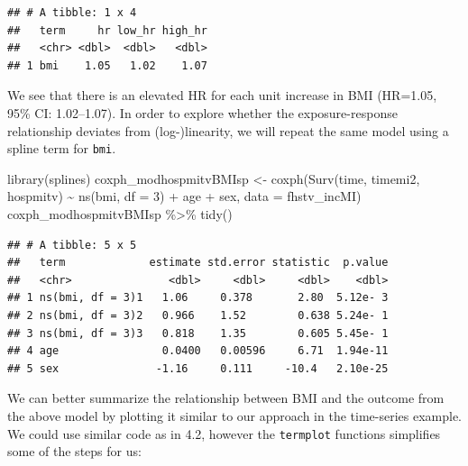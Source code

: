 \documentclass[
]{book}
\newenvironment{Shaded}{\begin{snugshade}}{\end{snugshade}}
\newcommand{\AttributeTok}[1]{\textcolor[rgb]{0.77,0.63,0.00}{#1}}
\newcommand{\DecValTok}[1]{\textcolor[rgb]{0.00,0.00,0.81}{#1}}
\newcommand{\FunctionTok}[1]{\textcolor[rgb]{0.00,0.00,0.00}{#1}}
\newcommand{\NormalTok}[1]{#1}
\newcommand{\OtherTok}[1]{\textcolor[rgb]{0.56,0.35,0.01}{#1}}
\newcommand{\SpecialCharTok}[1]{\textcolor[rgb]{0.00,0.00,0.00}{#1}}
\begin{document}
\begin{verbatim}
## # A tibble: 1 x 4
##   term     hr low_hr high_hr
##   <chr> <dbl>  <dbl>   <dbl>
## 1 bmi    1.05   1.02    1.07
\end{verbatim}

We see that there is an elevated HR for each unit increase in BMI (HR=1.05, 95\% CI: 1.02--1.07). In order to explore whether the exposure-response relationship deviates from (log-)linearity, we will repeat the same model using a spline term for \texttt{bmi}.

\begin{Shaded}
\begin{Highlighting}[]
\FunctionTok{library}\NormalTok{(splines)}
\NormalTok{coxph\_modhospmitvBMIsp }\OtherTok{\textless{}{-}} \FunctionTok{coxph}\NormalTok{(}\FunctionTok{Surv}\NormalTok{(time, timemi2, hospmitv) }\SpecialCharTok{\textasciitilde{}} 
                                  \FunctionTok{ns}\NormalTok{(bmi, }\AttributeTok{df =} \DecValTok{3}\NormalTok{) }\SpecialCharTok{+}\NormalTok{ age }\SpecialCharTok{+}\NormalTok{ sex, }
                                \AttributeTok{data =}\NormalTok{ fhstv\_incMI)}
\NormalTok{coxph\_modhospmitvBMIsp }\SpecialCharTok{\%\textgreater{}\%}
  \FunctionTok{tidy}\NormalTok{()}
\end{Highlighting}
\end{Shaded}

\begin{verbatim}
## # A tibble: 5 x 5
##   term             estimate std.error statistic  p.value
##   <chr>               <dbl>     <dbl>     <dbl>    <dbl>
## 1 ns(bmi, df = 3)1   1.06     0.378       2.80  5.12e- 3
## 2 ns(bmi, df = 3)2   0.966    1.52        0.638 5.24e- 1
## 3 ns(bmi, df = 3)3   0.818    1.35        0.605 5.45e- 1
## 4 age                0.0400   0.00596     6.71  1.94e-11
## 5 sex               -1.16     0.111     -10.4   2.10e-25
\end{verbatim}

We can better summarize the relationship between BMI and the outcome from the above model by plotting it similar to our approach in the time-series example. We could use similar code as in 4.2, however the \texttt{termplot} functions simplifies some of the steps for us:
\end{document}
